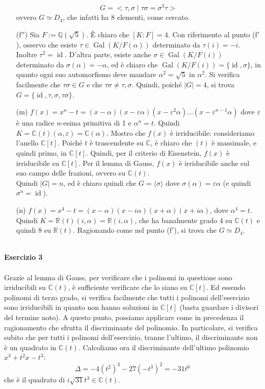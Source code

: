 \documentclass[12pt,a4paper]{report}
\theoremstyle{definition}
\DeclareMathOperator{\id}{id}
\DeclareMathOperator{\gal}{Gal}
\begin{document}
\begin{itemize}
$$G=<\tau, \sigma \mid \tau\sigma=\sigma^3\tau>$$
ovvero $G \simeq D_4$, che infatti ha 8 elementi, come cercato.
\item[(f$''$)] Sia $F:=\mathbb{Q}(\sqrt{5})$. È chiaro che $[K:F]=4$. Con riferimento al punto (f$'$), osservo che esiste $\tau \in \gal(K/F(\alpha))$ determinato da $\tau(i)=-i$. Inoltre $\tau^2=\id$. D'altra parte, esiste anche $\sigma \in \gal(K/F(i))$ determinato da $\sigma(\alpha)=-\alpha$, ed è chiaro che $\gal(K/F(i))=\{\id, \sigma\}$, in quanto ogni suo automorfismo deve mandare $\alpha^2=\sqrt{5}$ in $\alpha^2$.
Si verifica facilmente che $\tau\sigma \in G$ e che $\tau\sigma \neq \tau, \sigma$. Quindi, poiché $|G|=4$, si trova $G=\{\id, \tau, \sigma, \tau\sigma\}$.
\item[(m)]  $f(x)=x^n-t=(x-\alpha)(x-\varepsilon\alpha)(x-\varepsilon^2\alpha)...(x-\varepsilon^{n-1}\alpha)$ dove $\varepsilon$ è una radice $n$-esima primitiva di 1 e $\alpha^n=t$. Quindi $K=\mathbb{C}(t)(\alpha, \varepsilon)=\mathbb{C}(\alpha)$. Mostro che $f(x)$ è irriducibile: consideriamo l'anello $\mathbb{C}[t]$. Poiché $t$ è trascendente su $\mathbb{C}$, è chiaro che $(t)$ è massimale, e quindi primo, in $\mathbb{C}[t]$. Quindi, per il criterio di Eisenstein, $f(x)$ è irriducibile su $\mathbb{C}[t]$. Per il lemma di Gauss, $f(x)$ è irriducibile anche sul suo campo delle frazioni, ovvero su $\mathbb{C}(t)$.\\
Quindi $|G|=n$, ed è chiaro quindi che $G=\langle \sigma \rangle$ dove $\sigma(\alpha)=\varepsilon\alpha$ (e quindi $\sigma^n=\id$).
\item[(n)] $f(x)=x^4-t=(x-\alpha)(x-i\alpha)(x+\alpha)(x+i\alpha)$, dove $\alpha^4=t$. Quindi $K=\mathbb{R}(t)(i,\alpha)=\mathbb{R}(i,\alpha)$, che ha banalmente grado 4 su $\mathbb{C}(t)$ e quindi 8 su $\mathbb{R}(t)$. Ragionando come nel punto (f$'$), si trova che $G \simeq D_4$.
\end{itemize}\ 
\\
\noindent\textbf{Esercizio 3}\\
\\
Grazie al lemma di Gauss, per verificare che i polinomi in questione sono irriducibili su $\mathbb{C}(t)$, è sufficiente verificare che lo siano su $\mathbb{C}[t]$. Ed essendo polinomi di terzo grado, si verifica facilmente che tutti i polinomi dell'esercizio sono irriducibili in quanto non hanno soluzioni in $\mathbb{C}[t]$ (basta guardare i divisori del termine noto). A questo punto, possiamo applicare come in precedenza il ragionamento che sfrutta il discriminante del polinomio. In particolare, si verifica subito che per tutti i polinomi dell'esercizio, tranne l'ultimo, il discriminante non è un quadrato in $\mathbb{C}(t)$. Calcoliamo ora il discriminante dell'ultimo polinomio $x^3+t^2x-t^3$:
$$\Delta=-4(t^2)^3-27(-t^3)^2=-31t^6$$
che è il quadrato di $i\sqrt{31}t^3 \in \mathbb{C}(t)$.





 
\end{document}
